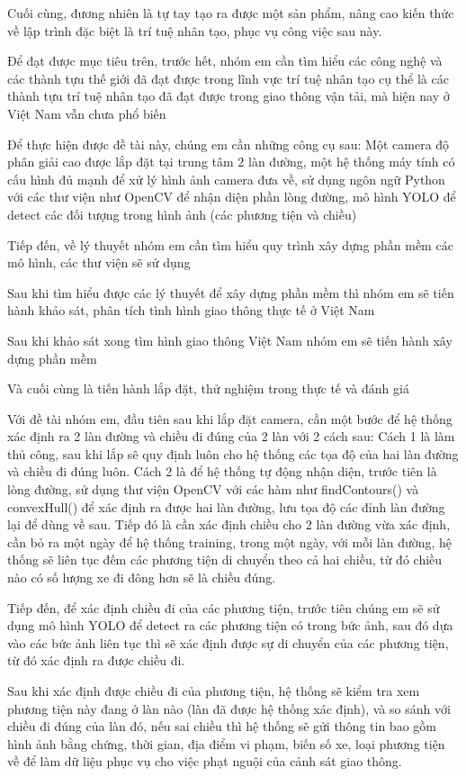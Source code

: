 \documentclass[12pt,twoside,a4paper]{article}
\begin{document}
Cuối cùng, đương nhiên là tự tay tạo ra được một sản phẩm, nâng cao kiến thức về lập trình đặc biệt là trí tuệ nhân tạo, phục vụ công việc sau này.

Để đạt được mục tiêu trên, trước hết, nhóm em cần tìm hiểu các công nghệ và các thành tựu thế giới đã đạt được trong lĩnh vực trí tuệ nhân tạo cụ thể là các thành tựu trí tuệ nhân tạo đã đạt được trong giao thông vận tải, mà hiện nay ở Việt Nam vẫn chưa phổ biến

Để thực hiện được đề tài này, chúng em cần những công cụ sau: Một camera độ phân giải cao được lắp đặt tại trung tâm 2 làn đường, một hệ thống máy tính có cấu hình đủ mạnh để xử lý hình ảnh camera đưa về, sử dụng ngôn ngữ Python với các thư viện như OpenCV để nhận diện phần lòng đường, mô hình YOLO để detect các đối tượng trong hình ảnh (các phương tiện và chiều)

Tiếp đến, về lý thuyết nhóm em cần tìm hiểu quy trình xây dựng phần mềm các mô hình, các thư viện sẽ sử dụng

Sau khi tìm hiểu được các lý thuyết để xây dựng phần mềm thì nhóm em sẽ tiến hành khảo sát, phân tích tình hình giao thông thực tế ở Việt Nam

Sau khi khảo sát xong tìm hình giao thông Việt Nam nhóm em sẽ tiến hành xây dựng phần mềm

Và cuối cùng là tiến hành lắp đặt, thử nghiệm trong thực tế và đánh giá

Với đề tài nhóm em, đầu tiên sau khi lắp đặt camera, cần một bước để hệ thống xác định ra 2 làn đường và chiều đi đúng của 2 làn với 2 cách sau: Cách 1 là làm thủ công, sau khi lắp sẽ quy định luôn cho hệ thống các tọa độ của hai làn đường và chiều đi đúng luôn. Cách 2 là để hệ thống tự động nhận diện, trước tiên là lòng đường, sử dụng thư viện OpenCV với các hàm như findContours() và convexHull() để xác định ra được hai làn đường, lưu tọa độ các đỉnh làn đường lại để dùng về sau. Tiếp đó là cần xác định chiều cho 2 làn đường vừa xác định, cần bỏ ra một ngày để hệ thống training, trong một ngày, với mỗi làn đường, hệ thống sẽ liên tục đếm các phương tiện di chuyển theo cả hai chiều, từ đó chiều nào có số lượng xe đi đông hơn sẽ là chiều đúng.

Tiếp đến, để xác định chiều đi của các phương tiện, trước tiên chúng em sẽ sử dụng mô hình YOLO để detect ra các phương tiện có trong bức ảnh, sau đó dựa vào các bức ảnh liên tục thì sẽ xác định được sự di chuyển của các phương tiện, từ đó xác định ra được chiều đi.

Sau khi xác định được chiều đi của phương tiện, hệ thống sẽ kiểm tra xem phương tiện này đang ở làn nào (làn đã được hệ thống xác định), và so sánh với chiều đi đúng của làn đó, nếu sai chiều thì hệ thống sẽ gửi thông tin bao gồm hình ảnh bằng chứng, thời gian, địa điểm vi phạm, biến số xe, loại phương tiện về để làm dữ liệu phục vụ cho việc phạt nguội của cảnh sát giao thông.
\end{document}
